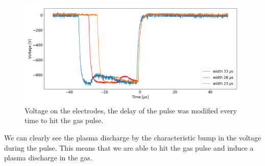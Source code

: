 \documentclass[a4paper,10pt]{article}
\begin{document}
\begin{figure}[H]
\centering
\includegraphics[width = \textwidth]{discharge}
\caption{Voltage on the electrodes, the delay of the pulse was modified every time to hit the gas pulse.}\label{discharge}
\end{figure}

We can clearly see the plasma discharge by the characteristic bump in the voltage during the pulse. This means that we are able to hit the gas pulse and induce a plasma discharge in the gas.
\end{document}
